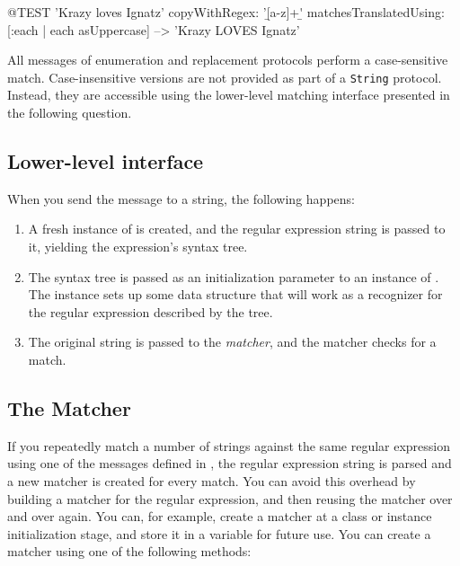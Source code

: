 \documentclass[10pt,twoside,chapterprefix=false]{scrbook}
\newcommand{\NewTerm}[1]{%
	\emph{#1}\marginnote{\emph{#1}}}
\renewcommand{\ct}{\lstinline[mathescape=false,basicstyle={\sffamily\upshape}]}
\begin{document}
{\begin{ToSh-code}{@TEST}
'Krazy loves Ignatz' copyWithRegex: '\b[a-z]+\b' matchesTranslatedUsing: [:each | each asUppercase] --> 'Krazy LOVES Ignatz'
\end{ToSh-code}

All messages of enumeration and replacement protocols perform a case-sensitive match.  Case-insensitive versions are not provided as part of a \ct{String} protocol.  Instead, they are accessible using the lower-level matching interface presented in the following question.
\subsection{Lower-level interface}

When you send the message  to a string, the following happens:

\begin{enumerate}
\item A fresh instance of  is created, and the regular expression string is passed to it, yielding the expression's syntax tree.
\item  The syntax tree is passed as an initialization parameter to an instance of . The instance sets up some data structure that will work as a recognizer for the regular expression described by the tree.
\item The original string is passed to the \NewTerm{matcher}, and the matcher checks for a match.
\end{enumerate}

\subsection{The Matcher}

If you repeatedly match a number of strings against the same regular expression using one of the messages defined in , the regular expression string is parsed and a new matcher is created for every match.  You can avoid this overhead by building a matcher for the regular expression, and then reusing the matcher over and over again. You can, for example, create a matcher at a class or instance initialization stage, and store it in a variable for future use.
You can create a matcher using one of the following methods:

}
\end{document}
